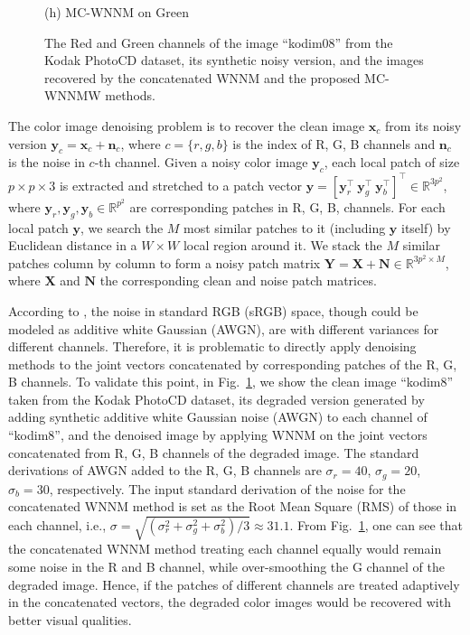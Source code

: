 \documentclass[10pt,twocolumn,letterpaper,sort&compress]{article}
\begin{document}
\begin{figure}
{\begin{minipage}[t]{0.25\textwidth}
{\footnotesize (h) MC-WNNM on Green}
\end{minipage}
}\vspace{-1mm}
\caption{The Red and Green channels of the image ``kodim08'' from the Kodak PhotoCD dataset, its synthetic noisy version, and the images recovered by the concatenated WNNM and the proposed MC-WNNMW methods.}
\label{f1}
\vspace{-2mm}
\end{figure}

The color image denoising problem is to recover the clean image $\mathbf{x}_{c}$ from its noisy version $\mathbf{y}_{c}=\mathbf{x}_{c}+\mathbf{n}_{c}$, where $c=\{r, g, b\}$ is the index of R, G, B channels and $\mathbf{n}_{c}$ is the noise in $c$-th channel. Given a noisy color image $\mathbf{y}_{c}$, each local patch of size $p\times p \times 3$ is extracted and stretched to a patch vector $\mathbf{y}=[\mathbf{y}_{r}^{\top}\ \mathbf{y}_{g}^{\top}\ \mathbf{y}_{b}^{\top}]^{\top}\in\mathbb{R}^{3p^{2}}$, where $\mathbf{y}_{r}, \mathbf{y}_{g}, \mathbf{y}_{b}\in\mathbb{R}^{p^{2}}$ are corresponding patches in R, G, B, channels. For each local patch $\mathbf{y}$, we search the $M$ most similar patches to it (including $\mathbf{y}$ itself) by Euclidean distance in a $W\times W$ local region around it. We stack the $M$ similar patches column by column to form a noisy patch matrix $\mathbf{Y}=\mathbf{X}+\mathbf{N}\in\mathbb{R}^{3p^{2}\times M}$, where $\mathbf{X}$ and $\mathbf{N}$ the corresponding clean and noise patch matrices.

According to \cite{Leungtip}, the noise in standard RGB (sRGB) space, though could be modeled as additive white Gaussian (AWGN), are with different variances for different channels. Therefore, it is problematic to directly apply denoising methods to the joint vectors concatenated by corresponding patches of the R, G, B channels. To validate this point, in Fig.\ \ref{f1}, we show the clean image ``kodim8'' taken from the Kodak PhotoCD dataset, its degraded version generated by adding synthetic additive white Gaussian noise (AWGN) to each channel of ``kodim8'', and the denoised image by applying WNNM \cite{wnnm} on the joint vectors concatenated from R, G, B channels of the degraded image. The standard derivations of AWGN added to the R, G, B channels are $\sigma_{r}=40$, $\sigma_{g}=20$, $\sigma_{b}=30$, respectively. The input standard derivation of the noise for the concatenated WNNM method is set as the Root Mean Square (RMS) of those in each channel, i.e., $\sigma=\sqrt{(\sigma_{r}^{2}+\sigma_{g}^{2}+\sigma_{b}^{2})/3}\approx31.1$. From Fig.\ \ref{f1}, one can see that the concatenated WNNM method treating each channel equally would remain some noise in the R and B channel, while over-smoothing the G channel of the degraded image. Hence, if the patches of different channels are treated adaptively in the concatenated vectors, the degraded color images would be recovered with better visual qualities.
\end{document}
